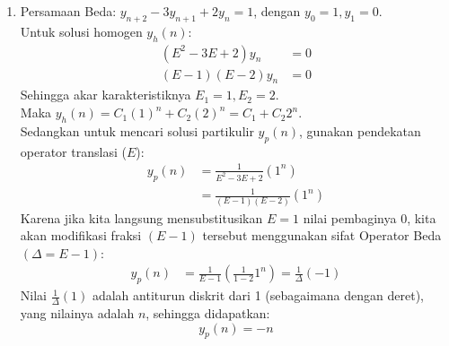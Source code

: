 \documentclass[11pt,letterpaper]{article}
\begin{document}
\begin{enumerate}
\begin{enumerate}[label=\alph*.]
                Maka dengan rumus Newton Maju:
                \begin{align*}
                  f(2.5) & \approx f(0) + s\Delta f(0) + \frac{s(s-1)}{2!}\Delta^2 f(0) + \frac{s(s-1)(s-2)}{3!}\Delta^3 f(0) + \frac{s(s-1)(s-2)(s-3)}{4!}\Delta^4 f(0) \\
                         & \approx 1 + 2.5(1) + \frac{(2.5)(1.5)}{2}(1) + \frac{(2.5)(1.5)(0.5)}{6}(1) + \frac{(2.5)(1.5)(0.5)(-0.5)}{24}(1)                             \\
                         & \approx 1 + 2.5 + 1.875 + 0.3125 - 0.0390625                                                                                                  \\
                         & \approx 5.6484375
                \end{align*}
          \item Berdasarkan data tabel: $f(x)$ selalu berbentuk fungsi eksponensial $f(x) = 2^x$. Hal ini juga terlihat dari nilai karakteristik kolom perbedaan yang selalu konstan secara berturut ($\Delta^k f(x) = f(x)$ untuk interval langkah $h=1$).
        \end{enumerate}

  \item Persamaan Beda: $y_{n+2} - 3y_{n+1} + 2y_n = 1$, dengan $y_0 = 1, y_1 = 0$. \\
        Untuk solusi homogen $y_h(n)$:
        \begin{align*}
          (E^2 - 3E + 2) y_n & = 0 \\
          (E-1)(E-2) y_n     & = 0
        \end{align*}
        Sehingga akar karakteristiknya $E_1 = 1, E_2 = 2$. \\
        Maka $y_h(n) = C_1 (1)^n + C_2 (2)^n = C_1 + C_2 2^n$. \\

        Sedangkan untuk mencari solusi partikulir $y_p(n)$, gunakan pendekatan operator translasi ($E$):
        \begin{align*}
          y_p(n) & = \frac{1}{E^2 - 3E + 2} (1^n) \\
                 & = \frac{1}{(E-1)(E-2)} (1^n)
        \end{align*}
        Karena jika kita langsung mensubstitusikan $E = 1$ nilai pembaginya $0$, kita akan modifikasi fraksi $(E-1)$ tersebut menggunakan sifat Operator Beda $(\Delta = E - 1)$:
        \begin{align*}
          y_p(n) & = \frac{1}{E-1} \left( \frac{1}{1-2} 1^n \right) = \frac{1}{\Delta} (-1)
        \end{align*}
        Nilai $\frac{1}{\Delta}(1)$ adalah antiturun diskrit dari 1 (sebagaimana dengan deret), yang nilainya adalah $n$, sehingga didapatkan:
        \[ y_p(n) = -n \]


\end{enumerate}
\end{document}
